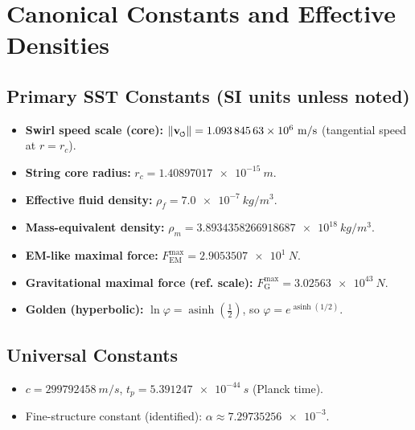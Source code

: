 \documentclass[11pt]{article}
\newcommand{\swirlarrow}{%
     \mathchoice{\mkern-2mu\scriptstyle\boldsymbol{\circlearrowleft}}%
                {\mkern-2mu\scriptstyle\boldsymbol{\circlearrowleft}}%
                {\mkern-2mu\scriptscriptstyle\boldsymbol{\circlearrowleft}}%
                {\mkern-2mu\scriptscriptstyle\boldsymbol{\circlearrowleft}}%
}
\newcommand{\vswirl}{\mathbf{v}_{\swirlarrow}}
\newcommand{\vnorm}{\lVert \vswirl \rVert}               %
\newcommand{\rhof}{\rho_{\!f}}                           %
\newcommand{\rhom}{\rho_{\!m}}                           %
\newcommand{\rc}{r_c}                                    %
\newcommand{\FmaxEM}{F_{\mathrm{EM}}^{\max}}             %
\newcommand{\FmaxG}{F_{\mathrm{G}}^{\max}}               %
\begin{document}
\section{Canonical Constants and Effective Densities}
\label{sec:canonical_constants}
\subsection*{Primary SST Constants (SI units unless noted)}
    \begin{itemize}
    \item \textbf{Swirl speed scale (core):} $\vnorm = \num{1.09384563e6}\ \si{m/s}$ (tangential speed at $r=\rc$).
    \item \textbf{String core radius:} $\rc = \num{1.40897017e-15}\ \si{m}$.
    \item \textbf{Effective fluid density:} $\rhof = \num{7.0e-7}\ \si{kg/m^3}$.
    \item \textbf{Mass-equivalent density:} $\rhom = \num{3.8934358266918687e18}\ \si{kg/m^3}$.
    \item \textbf{EM-like maximal force:} $\FmaxEM = \num{2.9053507e1}\ \si{N}$.
    \item \textbf{Gravitational maximal force (ref. scale):} $\FmaxG = \num{3.02563e43}\ \si{N}$.
    \item \textbf{Golden (hyperbolic):} $\ln\varphi=\operatorname{asinh}\!\left(\tfrac12\right)$, so $\varphi=e^{\operatorname{asinh}(1/2)}$.
    \end{itemize}

\subsection*{Universal Constants}
    \begin{itemize}
    \item $c=\num{299792458}\ \si{m/s}$, \quad $t_p=\num{5.391247e-44}\ \si{s}$ (Planck time).
    \item Fine-structure constant (identified): $\alpha \approx \num{7.29735256e-3}$.
    \end{itemize}
\end{document}
